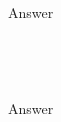 \documentclass[a4paper]{article}
\begin{document}
\subsection{~} %

Answer

\subsection{~} %

Answer

\end{document}
